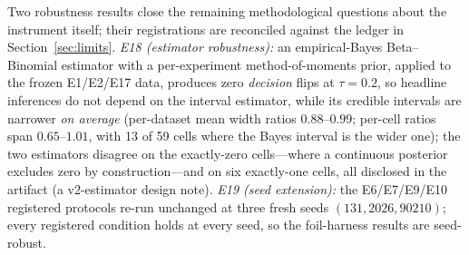 Two robustness results close the remaining methodological
questions about the instrument itself; their registrations are reconciled
against the ledger in Section~\ref{sec:limits}. \emph{E18 (estimator
robustness):} an
empirical-Bayes Beta--Binomial estimator with a per-experiment
method-of-moments prior, applied to the frozen E1/E2/E17 data, produces zero
\emph{decision} flips at $\tau=0.2$, so headline inferences do not depend on
the interval estimator, while its credible intervals are narrower
\emph{on average} (per-dataset mean width ratios $0.88$--$0.99$;
per-cell ratios span $0.65$--$1.01$, with 13 of 59 cells where the Bayes
interval is the wider one); the two estimators disagree on the exactly-zero
cells---where a continuous posterior excludes zero by construction---and on
six exactly-one cells, all disclosed in the artifact (a v2-estimator
design note).
\emph{E19 (seed extension):} the E6/E7/E9/E10 registered protocols re-run
unchanged at three fresh seeds $(131, 2026, 90210)$; every registered
condition holds at every seed, so the foil-harness results are seed-robust.
